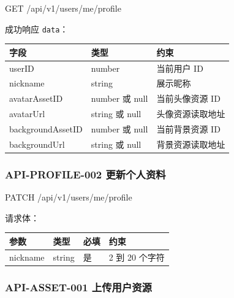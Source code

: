 \documentclass[
  a4paper,
  UTF8]{ctexart}
\newenvironment{Shaded}{}{}
\newcommand{\NormalTok}[1]{#1}
\begin{document}
\begin{Shaded}
\begin{Highlighting}[]
\NormalTok{GET /api/v1/users/me/profile}
\end{Highlighting}
\end{Shaded}

成功响应 \texttt{data}：

\begin{longtable}[]{@{}lll@{}}
\toprule
字段 & 类型 & 约束 \\
\midrule
\endhead
userID & number & 当前用户 ID \\
nickname & string & 展示昵称 \\
avatarAssetID & number 或 null & 当前头像资源 ID \\
avatarUrl & string 或 null & 头像资源读取地址 \\
backgroundAssetID & number 或 null & 当前背景资源 ID \\
backgroundUrl & string 或 null & 背景资源读取地址 \\
\bottomrule
\end{longtable}

\hypertarget{api-profile-002-ux66f4ux65b0ux4e2aux4ebaux8d44ux6599}{%
\subsubsection{API-PROFILE-002
更新个人资料}\label{api-profile-002-ux66f4ux65b0ux4e2aux4ebaux8d44ux6599}}

\begin{Shaded}
\begin{Highlighting}[]
\NormalTok{PATCH /api/v1/users/me/profile}
\end{Highlighting}
\end{Shaded}

请求体：

\begin{longtable}[]{@{}llll@{}}
\toprule
参数 & 类型 & 必填 & 约束 \\
\midrule
\endhead
nickname & string & 是 & 2 到 20 个字符 \\
\bottomrule
\end{longtable}

\hypertarget{api-asset-001-ux4e0aux4f20ux7528ux6237ux8d44ux6e90}{%
\subsubsection{API-ASSET-001
上传用户资源}\label{api-asset-001-ux4e0aux4f20ux7528ux6237ux8d44ux6e90}}
\end{document}
